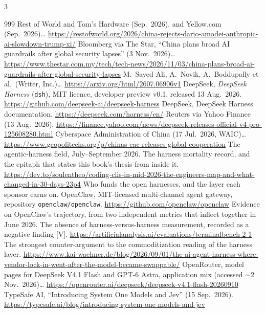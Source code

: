 \begin{multicols}{3}
\begin{thebibliography}{999}
 Rest of World and Tom's Hardware (Sep.\ 2026), and Yellow.com (Sep.\ 2026)… \url{https://restofworld.org/2026/china-rejects-dario-amodei-anthropic-ai-slowdown-trump-xi/}
 Bloomberg via The Star, ``China plans broad AI guardrails after global security lapses'' (3 Nov.\ 2026)… \url{https://www.thestar.com.my/tech/tech-news/2026/11/03/china-plans-broad-ai-guardrails-after-global-security-lapses}
 M.~Sayed Ali, A.~Novik, A.~Boddupally et al.\ (Writer, Inc.)… \url{https://arxiv.org/html/2607.06906v1}
 DeepSeek, \emph{DeepSeek Harness} (\texttt{dsh}), MIT licence, developer preview v0.1, released 13 Aug.\ 2026. \url{https://github.com/deepseek-ai/deepseek-harness}
 DeepSeek, DeepSeek Harness documentation. \url{https://deepseek.com/harness/en/}
 Reuters via Yahoo Finance (13 Aug.\ 2026). \url{https://finance.yahoo.com/news/deepseek-releases-official-v4-pro-125608280.html}
 Cyberspace Administration of China (17 Jul.\ 2026, WAIC)… \url{https://www.geopolitechs.org/p/chinas-cac-releases-global-cooperation}
 The agentic-harness field, July--September 2026.
 The harness mortality record, and the epitaph that states this book's thesis from inside it. \url{https://dev.to/soulentheo/coding-clis-in-mid-2026-the-engineers-map-and-what-changed-in-30-days-23p4}
 Who funds the open harnesses, and the layer each sponsor earns on.
 OpenClaw, MIT-licensed multi-channel agent gateway, repository \texttt{openclaw/openclaw}. \url{https://github.com/openclaw/openclaw}
 Evidence on OpenClaw's trajectory, from two independent metrics that inflect together in June 2026.
 The absence of harness-versus-harness measurement, recorded as a negative finding [V]. \url{https://artificialanalysis.ai/evaluations/terminalbench-2-1}
 The strongest counter-argument to the commoditization reading of the harness layer. \url{https://www.kai-waehner.de/blog/2026/09/01/the-ai-agent-harness-where-vendor-lock-in-went-after-the-model-became-swappable/}
 OpenRouter, model pages for DeepSeek V4.1 Flash and GPT-6 Astra, application mix (accessed $\sim$2 Nov.\ 2026)… \url{https://openrouter.ai/deepseek/deepseek-v4.1-flash-20260910}
 TypeSafe AI, ``Introducing System One Models and Jev'' (15 Sep.\ 2026). \url{https://typesafe.ai/blog/introducing-system-one-models-and-jev}

\end{thebibliography}
\end{multicols}

